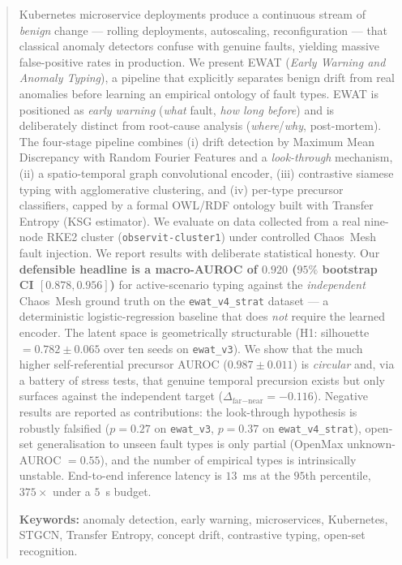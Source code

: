 \begin{abstract}
\noindent
Kubernetes microservice deployments produce a continuous stream of \emph{benign} change ---
rolling deployments, autoscaling, reconfiguration --- that classical anomaly detectors
confuse with genuine faults, yielding massive false-positive rates in production. We present
EWAT (\emph{Early Warning and Anomaly Typing}), a pipeline that explicitly separates benign
drift from real anomalies before learning an empirical ontology of fault types. EWAT is
positioned as \emph{early warning} (\emph{what} fault, \emph{how long before}) and is
deliberately distinct from root-cause analysis (\emph{where}/\emph{why}, post-mortem).
The four-stage pipeline combines (i) drift detection by Maximum Mean Discrepancy with Random
Fourier Features and a \emph{look-through} mechanism, (ii) a spatio-temporal graph convolutional
encoder, (iii) contrastive siamese typing with agglomerative clustering, and (iv) per-type
precursor classifiers, capped by a formal OWL/RDF ontology built with Transfer Entropy (KSG
estimator). We evaluate on data collected from a real nine-node RKE2 cluster
(\texttt{observit-cluster1}) under controlled Chaos~Mesh fault injection.
We report results with deliberate statistical honesty. Our \textbf{defensible headline is a
macro-AUROC of $0.920$ ($95\%$ bootstrap CI $[0.878, 0.956]$)} for active-scenario typing
against the \emph{independent} Chaos~Mesh ground truth on the \texttt{ewat\_v4\_strat} dataset
--- a deterministic logistic-regression baseline that does \emph{not} require the learned
encoder. The latent space is geometrically structurable (H1: silhouette $=0.782\pm0.065$ over
ten seeds on \texttt{ewat\_v3}). We show that the much higher self-referential precursor AUROC
($0.987\pm0.011$) is \emph{circular} and, via a battery of stress tests, that genuine temporal
precursion exists but only surfaces against the independent target ($\Delta_{\text{far}-\text{near}}=-0.116$).
Negative results are reported as contributions: the look-through hypothesis is robustly
falsified ($p=0.27$ on \texttt{ewat\_v3}, $p=0.37$ on \texttt{ewat\_v4\_strat}), open-set
generalisation to unseen fault types is only partial (OpenMax unknown-AUROC $=0.55$), and the
number of empirical types is intrinsically unstable. End-to-end inference latency is $13$~ms at
the $95$th percentile, $375\times$ under a $5$~s budget.

\smallskip
\noindent\textbf{Keywords:} anomaly detection, early warning, microservices, Kubernetes, STGCN,
Transfer Entropy, concept drift, contrastive typing, open-set recognition.
\end{abstract}
